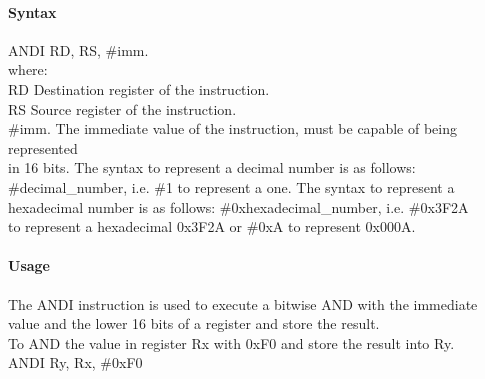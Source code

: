 \documentclass[12pt]{article}
\begin{document}
    \paragraph{Syntax}
    \begin{flushleft}
    ANDI RD, RS, \#imm.\\
    \vspace{1em}        %
    where:\\
    \vspace{1em}
    RD  \hspace{3.6em} Destination register of the instruction.\\
    \vspace{1em}
    RS  \hspace{3.85em} Source register of the instruction.\\
    \vspace{1em}
    \#imm.  \hspace{1.8em} The immediate value of the instruction, must be capable of being represented\\             \hspace{5.4em} in 16 bits. The syntax to represent a decimal number is as follows:\\
            \hspace{5.4em} \#decimal\_number, i.e. \#1 to represent a one. The syntax to represent a\\
            \hspace{5.4em} hexadecimal number is as follows: \#0xhexadecimal\_number, i.e. \#0x3F2A \\
            \hspace{5.4em} to represent a hexadecimal 0x3F2A or \#0xA to represent 0x000A.\\
    \end{flushleft}
    
    \paragraph{Usage}
    \begin{flushleft}
    The ANDI instruction is used to execute a bitwise AND with the immediate value and the lower 16 bits of a register and store the result.\\    
    \vspace{1em}
    To AND the value in register Rx with 0xF0 and store the result into Ry.\\
    \vspace{1em}
    ANDI Ry, Rx, \#0xF0
    \end{flushleft}
    
\end{document}
